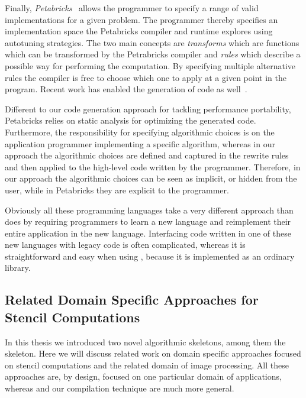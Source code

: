 \bigskip

Finally, \emph{Petabricks}~\cite{AnselCWOZEA09} allows the programmer to specify a range of valid implementations for a given problem.
The programmer thereby specifies an implementation space the Petabricks compiler and runtime explores using autotuning strategies.
The two main concepts are \emph{transforms} which are functions which can be transformed by the Petrabricks compiler and \emph{rules} which describe a possible way for performing the computation.
By specifying multiple alternative rules the compiler is free to choose which one to apply at a given point in the program.
Recent work has enabled the generation of \GPU code as well~\cite{PhothilimthanaARA13}.

Different to our code generation approach for tackling performance portability, Petabricks relies on static analysis for optimizing the generated code.
Furthermore, the responsibility for specifying algorithmic choices is on the application programmer implementing a specific algorithm, whereas in our approach the algorithmic choices are defined and captured in the rewrite rules and then applied to the high-level code written by the programmer.
Therefore, in our approach the algorithmic choices can be seen as implicit, or hidden from the user, while in Petabricks they are explicit to the programmer.

\bigskip
Obviously all these programming languages take a very different approach than \SkelCL does by requiring programmers to learn a new language and reimplement their entire application in the new language.
Interfacing code written in one of these new languages with legacy code is often complicated, whereas it is straightforward and easy when using \SkelCL, because it is implemented as an ordinary \Cpp library.

\subsection[Related Domain Specific Approaches for\\ Stencil Computations]{Related Domain Specific Approaches for Stencil Computations}
In this thesis we introduced two novel algorithmic skeletons, among them the \stencil skeleton.
Here we will discuss related work on domain specific approaches focused on stencil computations and the related domain of image processing.
All these approaches are, by design, focused on one particular domain of applications, whereas \SkelCL and our compilation technique are much more general.


